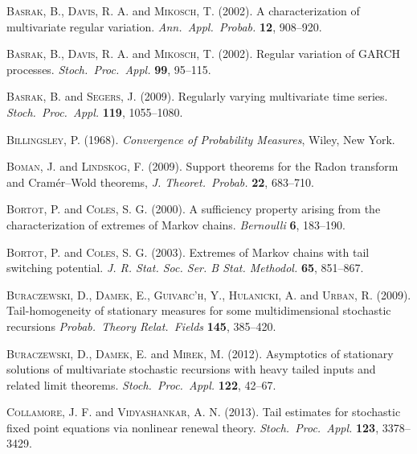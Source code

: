 \documentclass{aptpubarxiv}
\numberwithin{equation}{section}
\begin{document}
\begin{thebibliography}{}
\textsc{Basrak, B.}, \textsc{Davis, R. A.} and \textsc{Mikosch, T.} (2002). A characterization of multivariate regular variation. \emph{Ann.\ Appl.\ Probab.\/} {\bf 12}, 908--920.

\textsc{Basrak, B.}, \textsc{Davis, R. A.} and \textsc{Mikosch, T.} (2002). Regular variation of GARCH processes. {\em Stoch.\ Proc.\ Appl.\/} {\bf 99}, 95--115.

\textsc{Basrak, B.} and \textsc{Segers, J.} (2009). Regularly varying multivariate time series. {\em Stoch.\ Proc.\ Appl.\/} {\bf 119}, 1055--1080.

\textsc{Billingsley, P.} (1968). \emph{Convergence of Probability Measures}, Wiley, New York.

\textsc{Boman, J.} and \textsc{Lindskog, F.} (2009).
Support theorems for the Radon transform and Cram\'{e}r--Wold theorems,
\emph{J. Theoret.\ Probab.\/} \textbf{22}, 683--710.

\textsc{Bortot, P.} and \textsc{Coles, S. G.} (2000). A sufficiency property arising from the characterization of extremes of Markov chains. {\em Bernoulli} {\bf 6}, 183--190.
 
\textsc{Bortot, P.} and \textsc{Coles, S. G.} (2003). Extremes of Markov chains with tail switching potential. {\em J. R. Stat. Soc. Ser. B Stat. Methodol.\/} {\bf 65}, 851--867.

\textsc{Buraczewski, D.}, \textsc{Damek, E.}, \textsc{Guivarc'h, Y.}, \textsc{Hulanicki, A.} and \textsc{Urban, R.} (2009). Tail-homogeneity of stationary measures for some
multidimensional stochastic recursions {\em Probab.\ Theory Relat.\ Fields\/} {\bf 145}, 385--420.

\textsc{Buraczewski, D.}, \textsc{Damek, E.} and \textsc{Mirek, M.} (2012). Asymptotics of stationary solutions of multivariate stochastic recursions with heavy tailed inputs and related limit theorems. {\em Stoch.\ Proc.\ Appl.\/} {\bf 122}, 42--67.

\textsc{Collamore, J. F.} and \textsc{Vidyashankar, A. N.} (2013). Tail estimates for stochastic fixed point equations via nonlinear renewal theory. {\em Stoch.\ Proc.\ Appl.} {\bf 123}, 3378--3429.


\end{thebibliography}
\end{document}
